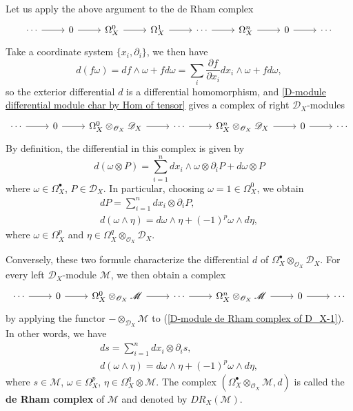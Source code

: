Let us apply the above argument to the de Rham complex
\[\begin{tikzcd}
\cdots\ar[r]&0\ar[r]&\Omega_X^0\ar[r]&\Omega_X^1\ar[r]&\cdots\ar[r]&\Omega_X^n\ar[r]&0\ar[r]&\cdots
\end{tikzcd}\]
Take a coordinate system $\{x_i,\partial_i\}$, we then have
\[d(f\omega)=df\wedge\omega+fd\omega=\sum_i\frac{\partial f}{\partial x_i}dx_i\wedge\omega+fd\omega,\]
so the exterior differential $d$ is a differential homomorphism, and \cref{D-module differential module char by Hom of tensor} gives a complex of right $\mathscr{D}_X$-modules
\begin{equation}\label{D-module de Rham complex of D_X-1}
\begin{tikzcd}
\cdots\ar[r]&0\ar[r]&\Omega_X^0\otimes_{\mathscr{O}_X}\mathscr{D}_X\ar[r]&\cdots\ar[r]&\Omega_X^n\otimes_{\mathscr{O}_X}\mathscr{D}_X\ar[r]&0\ar[r]&\cdots
\end{tikzcd}
\end{equation}
By definition, the differential in this complex is given by
\begin{equation}\label{D-module de Rham complex of D_X-2}
d(\omega\otimes P)=\sum_{i=1}^{n}dx_i\wedge \omega\otimes\partial_iP+d\omega\otimes P
\end{equation}  
where $\omega\in\Omega_X^\bullet$, $P\in\mathscr{D}_X$. In particular, choosing $\omega=1\in\Omega_X^0$, we obtain
\begin{gather}
dP=\sum_{i=1}^{n}dx_i\otimes\partial_iP,\label{D-module de Rham complex of D_X-3}\\
d(\omega\wedge\eta)=d\omega\wedge\eta+(-1)^p\omega\wedge d\eta,\label{D-module de Rham complex of D_X-4}
\end{gather}
where $\omega\in\Omega_X^p$ and $\eta\in\Omega_X^q\otimes_{\mathscr{O}_X}\mathscr{D}_X$.\par 

Conversely, these two formule characterize the differential $d$ of $\Omega_X^\bullet\otimes_{\mathscr{O}_X}\mathscr{D}_X$. For every left $\mathscr{D}_X$-module $\mathscr{M}$, we then obtain a complex
\[\begin{tikzcd}
\cdots\ar[r]&0\ar[r]&\Omega_X^0\otimes_{\mathscr{O}_X}\mathscr{M}\ar[r]&\cdots\ar[r]&\Omega_X^n\otimes_{\mathscr{O}_X}\mathscr{M}\ar[r]&0\ar[r]&\cdots
\end{tikzcd}\]
by applying the functor $-\otimes_{\mathscr{D}_X}\mathscr{M}$ to (\ref{D-module de Rham complex of D_X-1}). In other words, we have
\begin{gather}
ds=\sum_{i=1}^{n}dx_i\otimes\partial_is,\label{D-module de Rham complex of module-1}\\
d(\omega\wedge\eta)=d\omega\wedge\eta+(-1)^p\omega\wedge d\eta,\label{D-module de Rham complex ofmodule-2}
\end{gather}
where $s\in\mathscr{M}$, $\omega\in\Omega_X^p$, $\eta\in\Omega_X^q\otimes\mathscr{M}$. The complex $(\Omega_X^\bullet\otimes_{\mathscr{O}_X}\mathscr{M},d)$ is called the \textbf{de Rham complex} of $\mathscr{M}$ and denoted by $DR_X(\mathscr{M})$.\par

